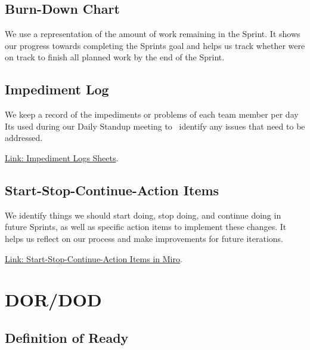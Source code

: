 \documentclass{article}
\begin{document}
\hypertarget{burndownchart}{
\subsection{\texorpdfstring{\textbf{Burn-Down
Chart}}{Burn-Down Chart}}\label{burndownchart}}

We use a representation of the amount of work remaining in the Sprint.
It shows our progress towards completing the Sprint\textquotesingle s
goal and helps us track whether we\textquotesingle re on track to finish
all planned work by the end of the Sprint.

\hypertarget{impedimentlog}{
\subsection{\texorpdfstring{\textbf{Impediment
Log}}{Impediment Log}}\label{impedimentlog}}

We keep a record of the impediments or problems of each team member per
day It\textquotesingle s used during our Daily Standup meeting to
~identify any issues that need to be addressed.

\href{https://jalafoundation.sharepoint.com/:f:/s/CoffeeTime/EvrueabkwZZPn-vQxfzknlcBg55BRdrfIEqUw9mxtrYNWg?e=JVZHfq}{Link: Impediment Logs Sheets}.


\hypertarget{startstopcontinueactionitems}{
\subsection{\texorpdfstring{\textbf{Start-Stop-Continue-Action
Items}}{Start-Stop-Continue-Action Items}}\label{startstopcontinueactionitems}}

We identify things we should start doing, stop doing, and continue doing
in future Sprints, as well as specific action items to implement these
changes. It helps us reflect on our process and make improvements for
future iterations.

\href{https://miro.com/app/board/uXjVKDO7l8M=/?share_link_id=7422815223}{Link: Start-Stop-Continue-Action Items in Miro}.

\newpage

\hypertarget{dordod}{
\section{DOR/DOD}\label{dordod}}

\hypertarget{definitionofready}{
\subsection{\texorpdfstring{\textbf{Definition of
Ready}}{Definition of Ready}}\label{definitionofready}}
\end{document}
